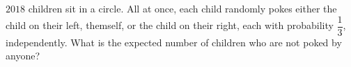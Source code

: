 $2018$ children sit in a circle. All at once, each child randomly pokes either the child on their left, themself, or the child on their right, each with probability $\dfrac{1}{3}$, independently. What is the expected number of children who are not poked by anyone?
